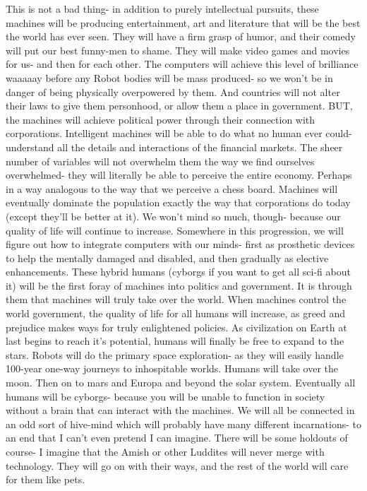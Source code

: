 \documentclass[a4paper]{article}
\begin{document}
This is not a bad thing- in addition to purely intellectual pursuits, these machines will be producing entertainment, art and literature that will be the best the world has ever seen. They will have a firm grasp of humor, and their comedy will put our best funny-men to shame.
They will make video games and movies for us- and then for each other.
The computers will achieve this level of brilliance waaaaay before any Robot bodies will be mass produced- so we won't be in danger of being physically overpowered by them.
And countries will not alter their laws to give them personhood, or allow them a place in government.
BUT, the machines will achieve political power through their connection with corporations. Intelligent machines will be able to do what no human ever could- understand all the details and interactions of the financial markets. The sheer number of variables will not overwhelm them the way we find ourselves overwhelmed- they will literally be able to perceive the entire economy. Perhaps in a way analogous to the way that we perceive a chess board.
Machines will eventually dominate the population exactly the way that corporations do today (except they'll be better at it). We won't mind so much, though- because our quality of life will continue to increase.
Somewhere in this progression, we will figure out how to integrate computers with our minds- first as prosthetic devices to help the mentally damaged and disabled, and then gradually as elective enhancements. These hybrid humans (cyborgs if you want to get all sci-fi about it) will be the first foray of machines into politics and government. It is through them that machines will truly take over the world.
When machines control the world government, the quality of life for all humans will increase, as greed and prejudice makes ways for truly enlightened policies.
As civilization on Earth at last begins to reach it's potential, humans will finally be free to expand to the stars.
Robots will do the primary space exploration- as they will easily handle 100-year one-way journeys to inhospitable worlds.
Humans will take over the moon. Then on to mars and Europa and beyond the solar system.
Eventually all humans will be cyborgs- because you will be unable to function in society without a brain that can interact with the machines. We will all be connected in an odd sort of hive-mind which will probably have many different incarnations- to an end that I can't even pretend I can imagine.
There will be some holdouts of course- I imagine that the Amish or other Luddites will never merge with technology. They will go on with their ways, and the rest of the world will care for them like pets.
\end{document}
